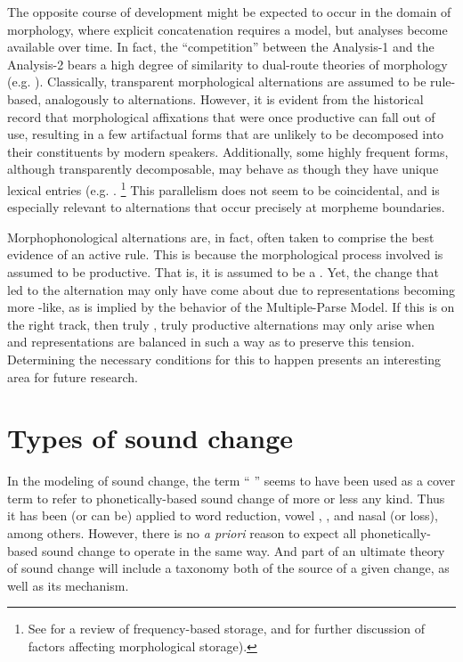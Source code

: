 The opposite course of development might be expected to occur in the
domain of morphology, where explicit concatenation requires a 
model, but  analyses become available over time. In fact,
the “competition” between the Analysis-1  and the Analysis-2  bears a high degree of similarity to dual-route theories of
morphology (e.g. \citealt{caramazza1988lexical,frauenfelder1992constraining}).
Classically, transparent morphological alternations are assumed to
be rule-based, analogously to  alternations. However, it
is evident from the historical record that morphological affixations
that were once productive can fall out of use, resulting in a few
artifactual forms that are unlikely to be decomposed into their constituents
by modern speakers. Additionally, some highly frequent forms, although
transparently decomposable, may behave as though they have unique
lexical entries (e.g. \citealt{baayen1997singulars}. \footnote{See \citealt{levelt1999theory}
for a review of frequency-based storage, and \citealt{burani1987representation,baayen1993frequency}
for further discussion of factors affecting morphological storage).}
This parallelism does not seem to be coincidental, and is especially
relevant to  alternations that occur precisely at morpheme
boundaries.

Morphophonological alternations are, in fact, often taken to comprise
the best evidence of an active  rule. This is because
the morphological process involved is assumed to be productive. That
is, it is assumed to be a . Yet, the change that led
to the  alternation may only have come about due to representations
becoming more -like, as is implied by the behavior of
the Multiple-Parse Model. If this is on the right track, then truly
, truly productive alternations may only arise when 
and  representations are balanced in such a way as to
preserve this tension. Determining the necessary conditions for this
to happen presents an interesting area for future research.

\section{Types of sound change}

In the modeling of sound change, the term “ ” seems
to have been used as a cover term to refer to phonetically-based sound
change of more or less any kind. Thus it has been (or can be) applied
to word reduction, vowel , , and nasal
 (or loss), among others. However, there is no \emph{a priori}
reason to expect all phonetically-based sound change to operate in
the same way. And part of an ultimate theory of sound change
will include a taxonomy both of the source of a given change, as well
as its  mechanism. 

